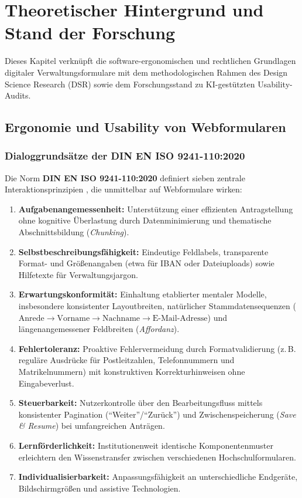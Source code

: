 \chapter{Theoretischer Hintergrund und Stand der Forschung}
\label{chap:theorie}

Dieses Kapitel verknüpft die software-ergonomischen und rechtlichen Grundlagen digitaler Verwaltungsformulare mit dem methodologischen Rahmen des Design Science Research (DSR) sowie dem Forschungsstand zu KI-gestützten Usability-Audits.

\section{Ergonomie und Usability von Webformularen}
\label{sec:usability_standards}

\subsection{Dialoggrundsätze der DIN EN ISO 9241-110:2020}
\label{subsec:iso_norm}

Die Norm \textbf{DIN EN ISO 9241-110:2020} definiert sieben zentrale Interaktionsprinzipien \parencite{iso9241110}, die unmittelbar auf Webformulare wirken:
\begin{enumerate}
    \item \textbf{Aufgabenangemessenheit:} Unterstützung einer effizienten Antragstellung ohne kognitive Überlastung durch Datenminimierung und thematische Abschnittsbildung (\textit{Chunking}).
    \item \textbf{Selbstbeschreibungsfähigkeit:} Eindeutige Feldlabels, transparente Format- und Größenangaben (etwa für IBAN oder Dateiuploads) sowie Hilfetexte für Verwaltungsjargon.
    \item \textbf{Erwartungskonformität:} Einhaltung etablierter mentaler Modelle, insbesondere konsistenter Layoutbreiten, natürlicher Stammdatensequenzen ($\text{Anrede} \rightarrow \text{Vorname} \rightarrow \text{Nachname} \rightarrow \text{E-Mail-Adresse}$) und längenangemessener Feldbreiten (\textit{Affordanz}).
    \item \textbf{Fehlertoleranz:} Proaktive Fehlervermeidung durch Formatvalidierung (z.\,B. reguläre Ausdrücke für Postleitzahlen, Telefonnummern und Matrikelnummern) mit konstruktiven Korrekturhinweisen ohne Eingabeverlust.
    \item \textbf{Steuerbarkeit:} Nutzerkontrolle über den Bearbeitungsfluss mittels konsistenter Pagination (\enquote{Weiter}/\enquote{Zurück}) und Zwischenspeicherung (\textit{Save \& Resume}) bei umfangreichen Anträgen.
    \item \textbf{Lernförderlichkeit:} Institutionenweit identische Komponentenmuster erleichtern den Wissenstransfer zwischen verschiedenen Hochschulformularen.
    \item \textbf{Individualisierbarkeit:} Anpassungsfähigkeit an unterschiedliche Endgeräte, Bildschirmgrößen und assistive Technologien.
\end{enumerate}

